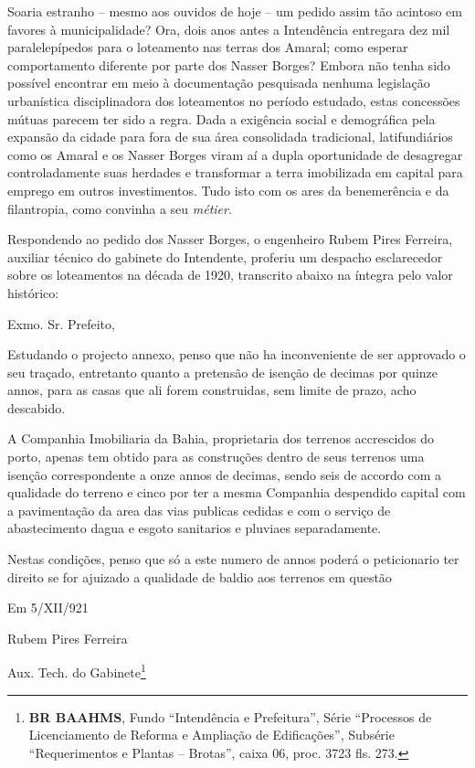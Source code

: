 Soaria estranho -- mesmo aos ouvidos de hoje -- um pedido assim tão acintoso em favores à municipalidade? Ora, dois anos antes a Intendência entregara dez mil paralelepípedos para o loteamento nas terras dos Amaral; como esperar comportamento diferente por parte dos Nasser Borges? Embora não tenha sido possível encontrar em meio à documentação pesquisada nenhuma legislação urbanística disciplinadora dos loteamentos no período estudado, estas concessões mútuas parecem ter sido a regra. Dada a exigência social e demográfica pela expansão da cidade para fora de sua área consolidada tradicional, latifundiários como os Amaral e os Nasser Borges viram aí a dupla oportunidade de desagregar controladamente suas herdades e transformar a terra imobilizada em capital para emprego em outros investimentos. Tudo isto com os ares da benemerência e da filantropia, como convinha a seu \textit{métier}.

Respondendo ao pedido dos Nasser Borges, o engenheiro Rubem Pires Ferreira, auxiliar técnico do gabinete do Intendente, proferiu um despacho esclarecedor sobre os loteamentos na década de 1920, transcrito abaixo na íntegra pelo valor histórico:

\begin{citacao}
Exmo. Sr. Prefeito,

Estudando o projecto annexo, penso que não ha inconveniente de ser approvado o seu traçado, entretanto quanto a pretensão de isenção de decimas por quinze annos, para as casas que ali forem construidas, sem limite de prazo, acho descabido.

A Companhia Imobiliaria da Bahia, proprietaria dos terrenos accrescidos do porto, apenas tem obtido para as construções dentro de seus terrenos uma isenção correspondente a onze annos de decimas, sendo seis de accordo com a qualidade do terreno e cinco por ter a mesma Companhia despendido capital com a pavimentação da area das vias publicas cedidas e com o serviço de abastecimento dagua e esgoto sanitarios e pluviaes separadamente.

Nestas condições, penso que só a este numero de annos poderá o peticionario ter direito se for ajuizado a qualidade de baldio aos terrenos em questão

Em 5/XII/921

Rubem Pires Ferreira

Aux. Tech. do Gabinete\footnote{\textbf{BR BAAHMS}, Fundo ``Intendência e Prefeitura'', Série ``Processos de Licenciamento de Reforma e Ampliação de Edificações'', Subsérie ``Requerimentos e Plantas -- Brotas'', caixa 06, proc. 3723 fls. 273.}
\end{citacao}

